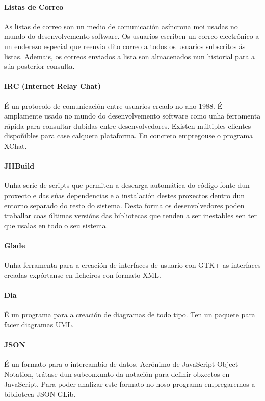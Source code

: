  \paragraph{Listas de Correo} As listas de correo son un medio de comunicación asíncrona moi usadas no mundo do desenvolvemento software. Os usuarios escriben un correo electrónico a un enderezo especial que reenvia dito correo a todos os usuarios subscritos ás listas. Ademais, os correos enviados a lista son almacenados nun historial para a súa posterior consulta.

 \paragraph{IRC (Internet Relay Chat)} É un protocolo de comunicación entre usuarios creado no ano 1988. É amplamente usado no mundo do desenvolvemento software como unha ferramenta rápida para consultar dubidas entre desenvolvedores. Existen múltiples clientes dispoñibles para case calquera plataforma. En concreto empregouse o programa XChat.

 \paragraph{JHBuild} Unha serie de scripts \cite{manual:jhbuild}  que permiten a descarga automática do código fonte dun proxecto e das súas dependencias e a instalación destes proxectos dentro dun entorno separado do resto do sistema. Desta forma os desenvolvedores poden traballar coas últimas versións das bibliotecas que tenden a ser inestables sen ter que usalas en todo o seu sistema.

\paragraph{Glade} Unha ferramenta para a creación de interfaces de usuario con GTK+ as interfaces creadas expórtanse en ficheiros con formato XML.

\paragraph{Dia} É un programa para a creación de diagramas de todo tipo. Ten un paquete para facer diagramas UML.

\paragraph{JSON} É un formato para o intercambio de datos. Acrónimo de JavaScript Object Notation, trátase dun subconxunto da notación para definir obxectos en JavaScript. Para poder analizar este formato no noso programa empregaremos a biblioteca JSON-GLib.

